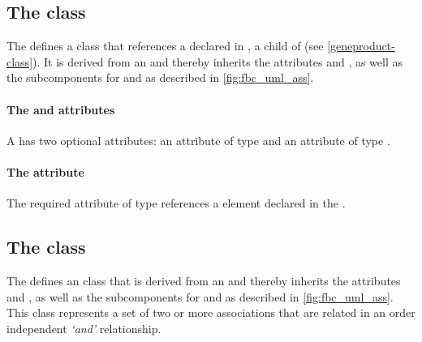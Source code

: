 \subsection{The \FBC {} class}
\label{geneproductref-class}

The \FBCPackage defines a \GeneProductRef class that references
a \GeneProduct declared in \ListOfGeneProducts, a child of
\Model (see \ref{geneproduct-class}). It is derived from an \Association and thereby inherits the \SBase attributes  and , as well as the subcomponents for \Annotation and \Notes as described in \ref{fig:fbc_uml_ass}.

\paragraph{The  and  attributes}
A \GeneProductRef has two optional attributes:  an attribute of
type  and  an attribute of type .


\paragraph{The  attribute}
The required  attribute of type %
references a \GeneProduct element declared in the \ListOfGeneProducts.
\pagebreak
\subsection{The \FBC {} class}
\label{and-class}

The \FBCPackage defines an \GeneAnd class that is derived from
an \Association and thereby inherits the \SBase attributes 
and , as well as the subcomponents for \Annotation and
\Notes as described in \ref{fig:fbc_uml_ass}. This class represents a
set of two or more associations that are related in an order independent
\emph{`and'} relationship.

